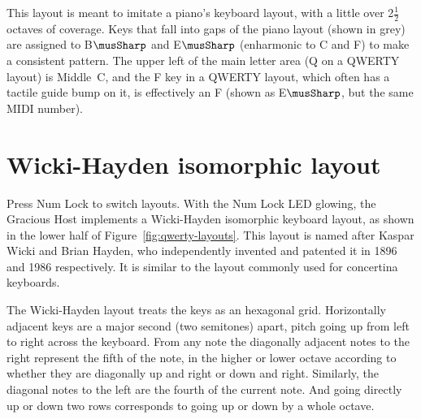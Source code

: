 This layout is meant to imitate a piano's keyboard layout, with a little
over 2$\tfrac{1}{2}$ octaves of coverage.  Keys that fall into gaps of the
piano layout (shown in grey) are assigned to B$\musSharp$ and E$\musSharp$
(enharmonic to C and F) to make a consistent pattern.  The upper left of the
main letter area (Q on a QWERTY layout) is Middle~C, and the F key in a
QWERTY layout, which often has a tactile guide bump on it, is effectively an
F (shown as E$\musSharp$, but the same MIDI number).


\section{Wicki-Hayden isomorphic layout}

Press Num Lock to switch layouts.  With the Num Lock LED glowing, the
Gracious Host implements a Wicki-Hayden isomorphic keyboard layout, as shown
in the lower half of Figure~\ref{fig:qwerty-layouts}.  This layout is named
after Kaspar Wicki and Brian Hayden, who independently invented and patented
it in 1896 and 1986 respectively.  It is similar to the layout commonly used
for concertina keyboards.

The Wicki-Hayden layout treats the keys as an hexagonal grid. 
Horizontally adjacent keys are a major second (two semitones) apart, pitch
going up from left to right across the keyboard.  From any note the
diagonally adjacent notes to the right represent the fifth of the note, in
the higher or lower octave according to whether they are diagonally up
and right or down and right.  Similarly, the diagonal notes to the left are
the fourth of the current note.  And going directly up or down two rows
corresponds to going up or down by a whole octave.

{\center{}\par}

